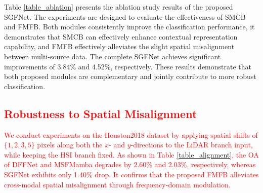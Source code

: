 Table \ref{table_ablation} presents the ablation study results of the proposed SGFNet. The experiments are designed to evaluate the effectiveness of SMCB and FMFB. Both modules consistently improve the classification performance, it demonstrates that SMCB can effectively enhance contextual representation capability, and FMFB effectively alleviates the slight spatial misalignment between multi-source data. The complete SGFNet achieves significant improvements of 3.84\% and 4.52\%, respectively. These results demonstrate that both proposed modules are complementary and jointly contribute to more robust classification. 

\subsection{\textcolor{red}{Robustness to Spatial Misalignment}}

\textcolor{red}{We conduct experiments on the Houston2018 dataset by applying spatial shifts of $\{1, 2, 3, 5\}$ pixels along both the $x$- and $y$-directions to the LiDAR branch input, while keeping the HSI branch fixed. As shown in Table \ref{table_alignment}, the OA of DFFNet and MSFMamba degrades by 2.60\% and 2.03\%, respectively, whereas SGFNet exhibits only 1.40\% drop. It confirms that the proposed FMFB alleviates cross-modal spatial misalignment through frequency-domain modulation.} 

\begin{table}[h]
  \centering
  \caption{OA (\%) under spatial shifts on the Houston2018 dataset.}
  \label{table_alignment}
\end{table}
